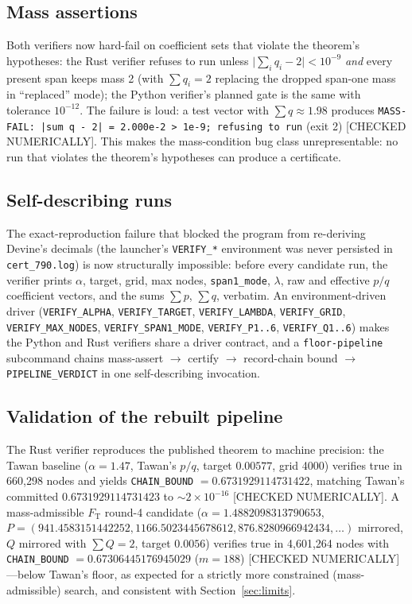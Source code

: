 \documentclass[11pt]{article}
\newcommand{\Ft}{F_{\mathrm{T}}}
\begin{document}
\subsection{Mass assertions}
Both verifiers now hard-fail on coefficient sets that violate the theorem's
hypotheses: the Rust verifier refuses to run unless
$\lvert \sum_i q_i - 2 \rvert < 10^{-9}$ \emph{and} every present span keeps
mass 2 (with $\sum q_i = 2$ replacing the dropped span-one mass in ``replaced''
mode); the Python verifier's planned gate is the same with tolerance
$10^{-12}$. The failure is loud: a test vector with $\sum q \approx 1.98$
produces \texttt{MASS-FAIL: |sum q - 2| = 2.000e-2 > 1e-9; refusing to run}
(exit 2) [CHECKED NUMERICALLY]. This makes the mass-condition bug class
unrepresentable: no run that violates the theorem's hypotheses can produce a
certificate.

\subsection{Self-describing runs}
The exact-reproduction failure that blocked the program from re-deriving
Devine's decimals (the launcher's \texttt{VERIFY\_*} environment was never
persisted in \texttt{cert\_790.log}) is now structurally impossible: before
every candidate run, the verifier prints $\alpha$, target, grid, max nodes,
\texttt{span1\_mode}, $\lambda$, raw and effective $p/q$ coefficient vectors,
and the sums $\sum p$, $\sum q$, verbatim. An environment-driven driver
(\texttt{VERIFY\_ALPHA}, \texttt{VERIFY\_TARGET}, \texttt{VERIFY\_LAMBDA},
\texttt{VERIFY\_GRID}, \texttt{VERIFY\_MAX\_NODES}, \texttt{VERIFY\_SPAN1\_MODE},
\texttt{VERIFY\_P1..6}, \texttt{VERIFY\_Q1..6}) makes the Python and Rust
verifiers share a driver contract, and a \texttt{floor-pipeline} subcommand
chains mass-assert $\to$ certify $\to$ record-chain bound
$\to$ \texttt{PIPELINE\_VERDICT} in one self-describing invocation.

\subsection{Validation of the rebuilt pipeline}
The Rust verifier reproduces the published theorem to machine precision:
the Tawan baseline ($\alpha = 1.47$, Tawan's $p/q$, target $0.00577$, grid
4000) verifies true in 660{,}298 nodes and yields
\texttt{CHAIN\_BOUND} $= 0.6731929114731422$, matching Tawan's committed
$0.6731929114731423$ to $\sim 2\times 10^{-16}$ [CHECKED NUMERICALLY]. A
mass-admissible $\Ft$ round-4 candidate
($\alpha = 1.4882098313790653$, $P = (941.4583151442252, 1166.5023445678612,
876.8280966942434,\ldots)$ mirrored, $Q$ mirrored with $\sum Q = 2$, target
$0.0056$) verifies true in 4{,}601{,}264 nodes with
\texttt{CHAIN\_BOUND} $= 0.67306445176945029$ ($m=188$)
[CHECKED NUMERICALLY]---below Tawan's floor, as expected for a strictly more
constrained (mass-admissible) search, and consistent with Section~\ref{sec:limits}.
\end{document}
